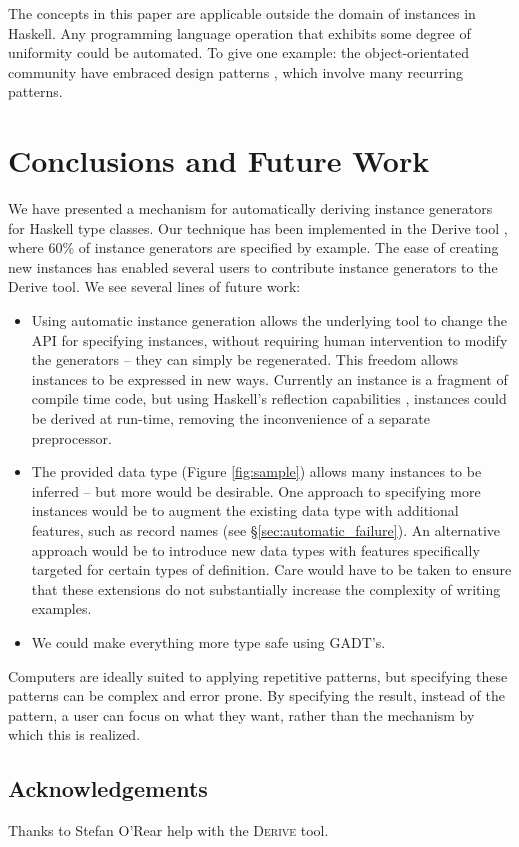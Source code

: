 \documentclass[preprint]{sigplanconf}
\newcommand{\derive}{\textsc{Derive}}
\begin{document}
The concepts in this paper are applicable outside the domain of instances in Haskell. Any programming language operation that exhibits some degree of uniformity could be automated. To give one example: the object-orientated community have embraced design patterns \cite{design_patterns}, which involve many recurring patterns.

\section{Conclusions and Future Work}
\label{sec:conclusion}

We have presented a mechanism for automatically deriving instance generators for Haskell type classes. Our technique has been implemented in the Derive tool \cite{derive}, where 60\% of instance generators are specified by example. The ease of creating new instances has enabled several users to contribute instance generators to the Derive tool. We see several lines of future work:

\begin{itemize}
\item Using automatic instance generation allows the underlying tool to change the API for specifying instances, without requiring human intervention to modify the generators -- they can simply be regenerated. This freedom allows instances to be expressed in new ways. Currently an instance is a fragment of compile time code, but using Haskell's reflection capabilities \cite{lammel:syb2}, instances could be derived at run-time, removing the inconvenience of a separate preprocessor.
\item The provided data type (Figure \ref{fig:sample}) allows many instances to be inferred -- but more would be desirable. One approach to specifying more instances would be to augment the existing data type with additional features, such as record names (see \S\ref{sec:automatic_failure}). An alternative approach would be to introduce new data types with features specifically targeted for certain types of definition. Care would have to be taken to ensure that these extensions do not substantially increase the complexity of writing examples.
\item We could make everything more type safe using GADT's.
\end{itemize}

Computers are ideally suited to applying repetitive patterns, but specifying these patterns can be complex and error prone. By specifying the result, instead of the pattern, a user can focus on what they want, rather than the mechanism by which this is realized.


\subsection*{Acknowledgements}

Thanks to Stefan O'Rear help with the \derive{} tool.


\balance



\end{document}
